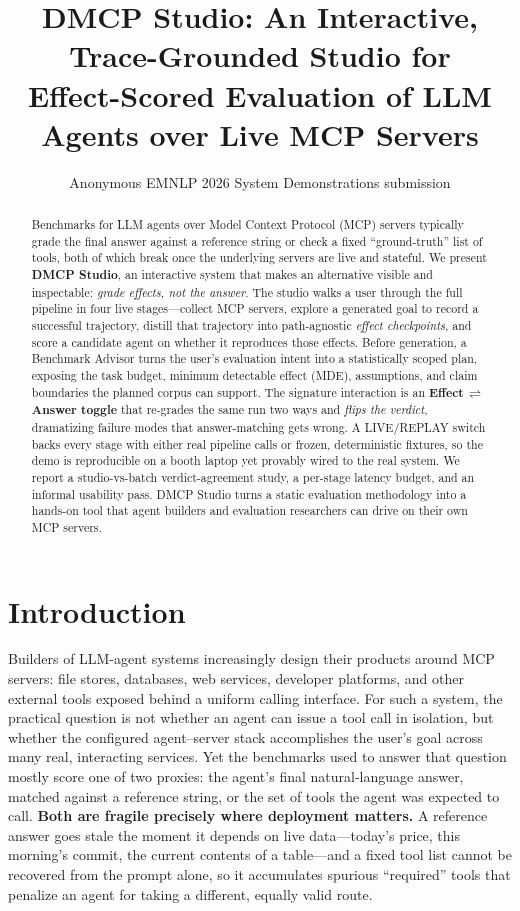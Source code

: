\documentclass[11pt]{article}
\title{DMCP Studio: An Interactive, Trace-Grounded Studio for\\
  Effect-Scored Evaluation of LLM Agents over Live MCP Servers}
\author{Anonymous EMNLP 2026 System Demonstrations submission}
\begin{document}
\maketitle

\begin{abstract}
Benchmarks for LLM agents over Model Context Protocol (MCP) servers
typically grade the final answer against a reference string or check a
fixed ``ground-truth'' list of tools, both of which break once the
underlying servers are live and stateful. We present \textbf{DMCP
Studio}, an interactive system that makes an alternative visible and
inspectable: \emph{grade effects, not the answer}. The studio walks a user
through the full pipeline in four live stages---collect MCP servers, explore a
generated goal to record a successful trajectory, distill that trajectory into
path-agnostic \emph{effect checkpoints}, and score a candidate agent on whether
it reproduces those effects. Before generation, a Benchmark Advisor turns the
user's evaluation intent into a statistically scoped plan, exposing the task
budget, minimum detectable effect (MDE), assumptions, and claim boundaries the
planned corpus can support. The signature interaction is an
\textbf{Effect\,$\rightleftharpoons$\,Answer toggle} that re-grades the same
run two ways and \emph{flips the verdict}, dramatizing failure modes that
answer-matching gets wrong. A LIVE/REPLAY switch backs every stage with either
real pipeline calls or frozen, deterministic fixtures, so the demo is
reproducible on a booth laptop yet provably wired to the real system. We report
a studio-vs-batch verdict-agreement study, a per-stage latency budget, and an
informal usability pass. DMCP Studio turns a static evaluation methodology into
a hands-on tool that agent builders and evaluation researchers can drive on
their own MCP servers.
\end{abstract}

\section{Introduction}
\label{sec:intro}

Builders of LLM-agent systems increasingly design their products around MCP
servers: file stores, databases, web services, developer platforms, and other
external tools exposed behind a uniform calling interface. For such a system,
the practical question is not whether an agent can issue a tool call in
isolation, but whether the configured agent--server stack accomplishes the
user's goal across many real, interacting services. Yet the benchmarks used to
answer that question mostly score one of two proxies: the agent's final
natural-language answer, matched against a reference string, or the set of
tools the agent was expected to call. \textbf{Both are fragile precisely where
deployment matters.} A reference answer goes stale the moment it depends on
live data---today's price, this morning's commit, the current contents of a
table---and a fixed tool list cannot be recovered from the prompt alone, so it
accumulates spurious ``required'' tools that penalize an agent for taking a
different, equally valid route.
\end{document}
